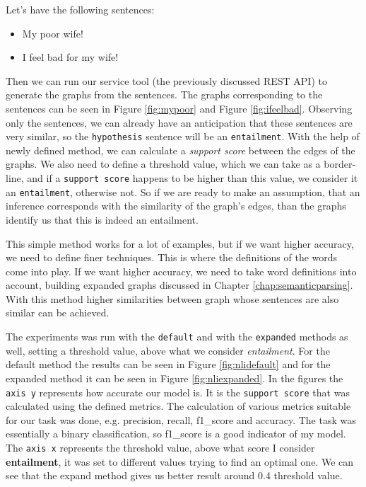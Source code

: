 Let's have the following sentences:
\begin{itemize}
	\item My poor wife!
	\item I feel bad for my wife!
\end{itemize}
Then we can run our service tool (the previously discussed REST API) to generate the graphs from the sentences. The graphs corresponding to the sentences can be seen in Figure \ref{fig:mypoor} and Figure \ref{fig:ifeelbad}. Observing only the sentences, we can already have an anticipation that these sentences are very similar, so the \texttt{hypothesis} sentence will be an \texttt{entailment}. With the help of newly defined method, we can calculate a \textit{support score} between the edges of the graphs. We also need to define a threshold value, which we can take as a border-line, and if a \texttt{support score} happens to be higher than this value, we consider it an \texttt{entailment}, otherwise not. So if we are ready to make an assumption, that an inference corresponds with the similarity of the graph's edges, than the graphs identify us that this is indeed an entailment. 

This simple method works for a lot of examples, but if we want higher accuracy, we need to define finer techniques. This is where the definitions of the words come into play. If we want higher accuracy, we need to take word definitions into account, building expanded graphs discussed in Chapter \ref{chap:semanticparsing}. With this method higher similarities between graph whose sentences are also similar can be achieved.

The experiments was run with the \texttt{default} and with the \texttt{expanded} methods as well, setting a threshold value, above what we consider \textit{entailment}. For the default method the results can be seen in Figure \ref{fig:nlidefault} and for the expanded method it can be seen in Figure \ref{fig:nliexpanded}. In the figures the \texttt{axis y} represents how accurate our model is. It is the \texttt{support score} that was calculated using the defined metrics. The calculation of various metrics suitable for our task was done, e.g. precision, recall, f1\_score and accuracy. The task was essentially a binary classification, so f1\_score is a good indicator of my model. The \texttt{axis x} represents the threshold value, above what score I consider \textbf{entailment}, it was set to different values trying to find an optimal one. We can see that the expand method gives us better result around 0.4 threshold value.

